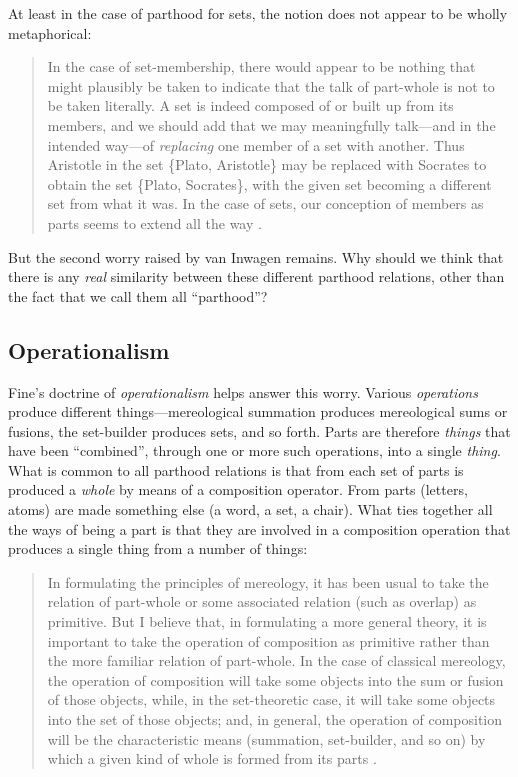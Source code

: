 \documentclass[12pt,twoside]{reedfancy}
\begin{document}
\begin{spacing}{1.25}
At least in the case of parthood for sets, the notion does not appear
to be wholly metaphorical:

\begin{quote}
In the case of set-membership, there would appear to be nothing that
might plausibly be taken to indicate that the talk of part-whole is
not to be taken literally. A set is indeed composed of or built up
from its members, and we should add that we may meaningfully
talk---and in the intended way---of \emph{replacing} one member of a
set with another.  Thus Aristotle in the set \{Plato, Aristotle\} may
be replaced with Socrates to obtain the set \{Plato, Socrates\}, with
the given set becoming a different set from what it was. In the case
of sets, our conception of members as parts seems to extend all the
way \citep[564]{fine2010}.
\end{quote}

But the second worry raised by van Inwagen remains.  Why should we
think that there is any {\em real} similarity between these different
parthood relations, other than the fact that we call them all
``parthood''?

\subsection{Operationalism}
\label{operation}
Fine's doctrine of {\em operationalism} helps answer this worry.
Various {\em operations} produce different things---mereological
summation produces mereological sums or fusions, the set-builder
produces sets, and so forth.  Parts are therefore {\em things} that
have been ``combined'', through one or more such operations, into a
single {\em thing}.  What is common to all parthood relations is that
from each set of parts is produced a {\em whole} by means of a
composition operator.  From parts (letters, atoms) are made something
else (a word, a set, a chair).  What ties together all the ways of
being a part is that they are involved in a composition operation that
produces a single thing from a number of things:

\begin{quote}
In formulating the principles of mereology, it has been usual to take
the relation of part-whole or some associated relation (such as
overlap) as primitive.  But I believe that, in formulating a more
general theory, it is important to take the operation of composition
as primitive rather than the more familiar relation of part-whole.  In
the case of classical mereology, the operation of composition will
take some objects into the sum or fusion of those objects, while, in
the set-theoretic case, it will take some objects into the set of
those objects; and, in general, the operation of composition will be
the characteristic means (summation, set-builder, and so on) by which
a given kind of whole is formed from its parts \citep[565]{fine2010}.
\end{quote}


\end{spacing}
\end{document}
